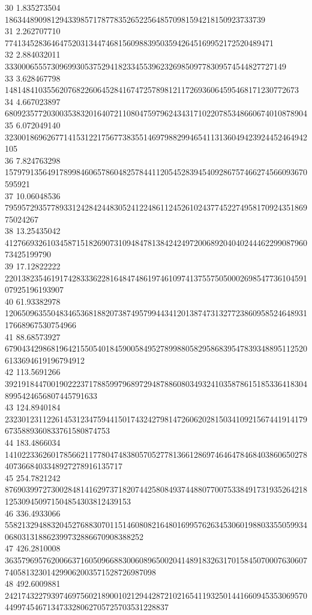 \documentclass[10pt]{article}
\begin{document}
{30	1.835273504	18634489098129433985717877835265225648570981594218150923733739\\
31	2.262707710	7741345283646475203134474681560988395035942645169952172520489471\\
32	2.884032011	3330006555730969930537529418233455396232698509778309574544827727149\\
33	3.628467798	1481484103556207682260645284167472578981211726936064595468171230772673\\
34	4.667023897	680923577203003538320164072110804759796243431710220785348660674010878904\\
35	6.072049140	323001869626771415312217567738355146979882994654113136049423924452464942105\\
36	7.824763298	157979135649178998460657860482578441120545283945409286757466274566093670595921\\
37	10.06048536	79595729357789331242842448305241224861124526102437745227495817092435186975024267\\
38	13.25435042	41276693261034587151826907310948478138424249720068920404024446229908796073425199790\\
39	17.12822222	22013823546191742833362281648474861974610974137557505000269854773610459107925196193907\\
40	61.93382978	12065096355048346536818820738749579944341201387473132772386095852464893117668967530754966\\
41	88.68573927	6790434298681964215505401845900584952789988058295868395478393488951125206133694619196794912\\
42	113.5691266	3921918447001902223717885997968972948788608034932410358786151853364183048995424656807445791633\\
43	124.8940184	2323012311226145312347594415017432427981472606202815034109215674419141796735889360833761580874753\\
44	183.4866034	1410223362601785662117780474838057052778136612869746464784684038606502784073668403348927278916135717\\
45	254.7821242	876903997273002848141629737182074425808493744880770075338491731935264218125309450971504854303812439153\\
46	336.4933066	558213294883204527688307011514608082164801699576263453060198803355059934068031318862399732886670908388252\\
47	426.2810008	363579695762006637160509668830060896500204148918326317015845070007630607740581323014299062003571528726987098\\
48	492.6009881	242174322793974697560218900102129442872102165411932501441660945353069570449974546713473328062705725703531228837\\
}
\end{document}
